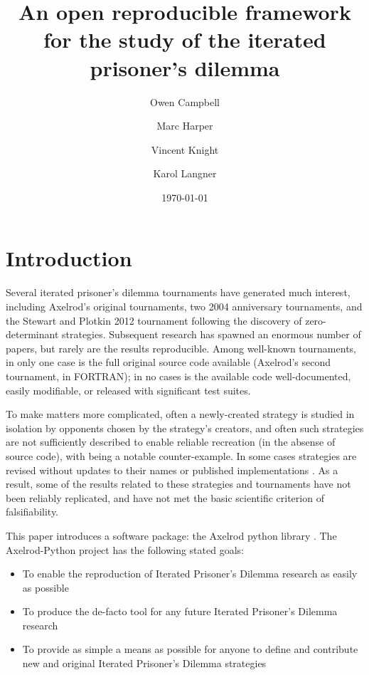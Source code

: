 \documentclass{article}
\title{An open reproducible framework for the study of the iterated prisoner's
dilemma}
\author{Owen Campbell\\
        \and
        Marc Harper\\
        \and
        Vincent Knight\\
        \and
        Karol Langner\\
}
\date{\today}
\begin{document}
\maketitle

\section{Introduction}\label{sec:introduction}

Several iterated prisoner's dilemma tournaments have generated much interest,
including Axelrod's original tournaments, two 2004 anniversary tournaments, and
the Stewart and Plotkin 2012 tournament following the discovery of
zero-determinant strategies.  Subsequent research has spawned an enormous number
of papers, but rarely are the results reproducible. Among well-known
tournaments, in only one case is the full original source code available
(Axelrod's second tournament, in FORTRAN); in no cases is the available code
well-documented, easily modifiable, or released with significant test suites.

To make matters more complicated, often a newly-created strategy is studied in
isolation by opponents chosen by the strategy's creators, and often such
strategies are not sufficiently described to enable reliable recreation
(in the absense of source code), with \cite{slany2007some} being a notable
counter-example. In some cases strategies are revised without updates to their
names or published implementations \cite{li2007design, li2011engineering}.
As a result, some of the results related to these strategies and tournaments
have not been reliably replicated, and have not met the basic scientific
criterion of falsifiability.

This paper introduces a software package: the Axelrod python library
\cite{Axelrod-Pythonprojectteam2015}. The Axelrod-Python project has the
following stated goals:

\begin{itemize}
    \item To enable the reproduction of Iterated Prisoner's Dilemma
    research as easily as possible
    \item To produce the de-facto tool for any future Iterated Prisoner's
    Dilemma research
    \item To provide as simple a means as possible for anyone to define and
    contribute new and original Iterated Prisoner's Dilemma strategies
\end{itemize}
\end{document}
